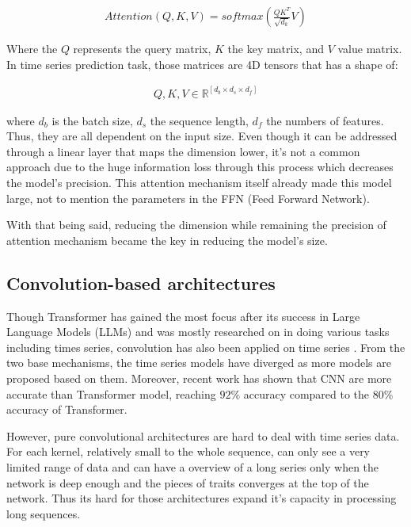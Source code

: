 \documentclass[stu,12pt,floatsintext]{apa7}
\begin{document}
\begin{gather}
    Attention(Q,K,V)=softmax(\frac{QK^T}{\sqrt{d_k}}V)
\end{gather}

Where the $Q$ represents the query matrix, $K$ the key matrix, and $V$ value matrix. In time series prediction task, those matrices are 4D tensors that has a shape of:

\begin{gather}
        Q,K,V\in \mathbb{R}^{[d_b \times d_s \times d_f]}
\end{gather}

where $d_b$ is the batch size, $d_s$ the sequence length, $d_f$ the numbers of features. Thus, they are all dependent on the input size. Even though it can be addressed through a linear layer that maps the dimension lower, it's not a common approach due to the huge information loss through this process which decreases the model's precision. This attention mechanism itself already made this model large, not to mention the parameters in the FFN (Feed Forward Network). 

With that being said, reducing the dimension while remaining the precision of attention mechanism became the key in reducing the model's size. 

\subsection{Convolution-based architectures}

Though Transformer has gained the most focus after its success in Large Language Models (LLMs) and was mostly researched on in doing various tasks including times series, convolution has also been applied on time series \parencite{hewage2020temporal}. From the two base mechanisms, the time series models have diverged as more models are proposed based on them. Moreover, recent work \parencite{cnntransformercompare} has shown that CNN are more accurate than Transformer model, reaching $92\%$ accuracy compared to the $80\%$ accuracy of Transformer. 

However, pure convolutional architectures are hard to deal with time series data. For each kernel, relatively small to the whole sequence, can only see a very limited range of data and can have a overview of a long series only when the network is deep enough and the pieces of traits converges at the top of the network. Thus its hard for those architectures expand it's capacity in processing long sequences. 
\end{document}
